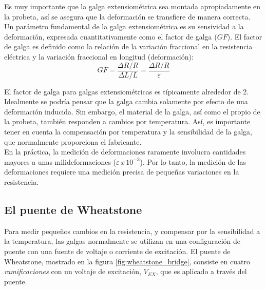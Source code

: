 Es muy importante que la galga extensiométrica sea montada apropiadamente en la probeta, así 
se asegura que la deformación se transfiere de manera correcta.\\

Un parámetro fundamental de la galga extensiométrica es su sensividad a la deformación, expresada 
cuantitativamente como el factor de galga ($GF$). El factor de galga es definido como la relación 
de la variación fraccional en la resistencia eléctrica y la variación fraccional en longitud (deformación):
~\cite{gageNI} \\

\begin{equation}
GF = \frac{\Delta R/R}{\Delta L/L} = \frac{\Delta R/R}{\varepsilon}
\end{equation}

El factor de galga para galgas extensiométricas es típicamente alrededor de 2. ~\cite{gageNI}\\

Idealmente se podría pensar que la galga cambia solamente por efecto de una deformación 
inducida. Sin embargo, el material de la galga, así como el propio de la probeta, también 
responden a cambios por temperatura. Así, es importante tener en cuenta la compensación 
por temperatura y la sensibilidad de la galga, que normalmente proporciona el fabricante. \\

En la práctica, la medición de deformaciones raramente involucra cantidades mayores a 
unas milideformaciones ($\varepsilon \, x \, 10^{-3}$). Por lo tanto, la medición 
de las deformaciones requiere una medición precisa de pequeñas variaciones en la resistencia. ~\cite{gageNI}\\

\subsection{El puente de Wheatstone}

Para medir pequeños cambios en la resistencia, y compensar por la sensibilidad a la temperatura, 
las galgas normalmente se utilizan en una configuración de puente con una fuente de voltaje o 
corriente de excitación. El puente de Wheatstone, mostrado en la figura \ref{fig:wheatstone_bridge}, 
consiste en cuatro \textit{ramificaciones} con un voltaje de excitación, $V_{EX}$, que es 
aplicado a través del puente. ~\cite{gageNI}\\

